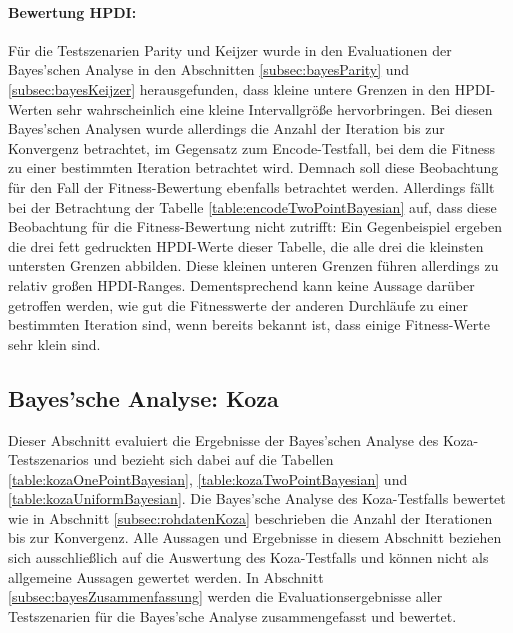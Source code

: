 \paragraph{Bewertung HPDI:}
Für die Testszenarien Parity und Keijzer wurde in den Evaluationen der Bayes'schen Analyse in den Abschnitten \ref{subsec:bayesParity} und \ref{subsec:bayesKeijzer} herausgefunden, dass kleine untere Grenzen in den HPDI-Werten sehr wahrscheinlich eine kleine Intervallgröße hervorbringen.
Bei diesen Bayes'schen Analysen wurde allerdings die Anzahl der Iteration bis zur Konvergenz betrachtet, im Gegensatz zum Encode-Testfall, bei dem die Fitness zu einer bestimmten Iteration betrachtet wird.
Demnach soll diese Beobachtung für den Fall der Fitness-Bewertung ebenfalls betrachtet werden.
Allerdings fällt bei der Betrachtung der Tabelle \ref{table:encodeTwoPointBayesian} auf, dass diese Beobachtung für die Fitness-Bewertung nicht zutrifft:
Ein Gegenbeispiel ergeben die drei fett gedruckten HPDI-Werte dieser Tabelle, die alle drei die kleinsten untersten Grenzen abbilden.
Diese kleinen unteren Grenzen führen allerdings zu relativ großen HPDI-Ranges.
Dementsprechend kann keine Aussage darüber getroffen werden, wie gut die Fitnesswerte der anderen Durchläufe zu einer bestimmten Iteration sind, wenn bereits bekannt ist, dass einige Fitness-Werte sehr klein sind.


\subsection{Bayes'sche Analyse: Koza}
\label{subsec:bayesKoza}

Dieser Abschnitt evaluiert die Ergebnisse der Bayes'schen Analyse des Koza-Testszenarios und bezieht sich dabei auf die Tabellen \ref{table:kozaOnePointBayesian}, \ref{table:kozaTwoPointBayesian} und \ref{table:kozaUniformBayesian}.
Die Bayes'sche Analyse des Koza-Testfalls bewertet wie in Abschnitt \ref{subsec:rohdatenKoza} beschrieben die Anzahl der Iterationen bis zur Konvergenz.
Alle Aussagen und Ergebnisse in diesem Abschnitt beziehen sich ausschließlich auf die Auswertung des Koza-Testfalls und können nicht als allgemeine Aussagen gewertet werden.
In Abschnitt \ref{subsec:bayesZusammenfassung} werden die Evaluationsergebnisse aller Testszenarien für die Bayes'sche Analyse zusammengefasst und bewertet.
